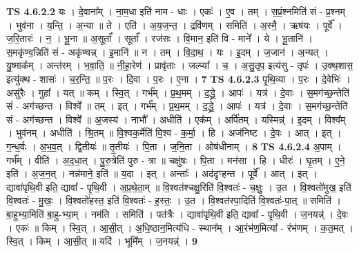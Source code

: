 \documentclass[17pt]{extarticle}
\begin{document}
                  \newline
                                \textbf{ TS 4.6.2.2} \newline
                  यः । दे॒वाना᳚म् । ना॒म॒धा इति॑ नाम - धाः । एकः॑ । ए॒व । तम् । स॒प्रं॒श्नमिति॑ सं - प्र॒श्नम् । भुव॑ना । य॒न्ति॒ । अ॒न्या ॥ ते । एति॑ । अ॒य॒ज॒न्त॒ । द्रवि॑णम् । समिति॑ । अ॒स्मै॒ । ऋष॑यः । पूर्वे᳚ । ज॒रि॒तारः॑ । न॒ । भू॒ना ॥ अ॒सूर्ता᳚ । सूर्ता᳚ । रज॑सः । वि॒मान॒ इति॑ वि - माने᳚ । ये । भू॒तानि॑ । स॒मकृ॑ण्व॒न्निति॑ सं - अकृ॑ण्वन्न् । इ॒मानि॑ ॥ न । तम् । वि॒दा॒थ॒ । यः । इ॒दम् । ज॒जान॑ । अ॒न्यत् । यु॒ष्माक᳚म् । अन्त॑रम् । भ॒वा॒ति॒ ॥ नी॒हा॒रेण॑ । प्रावृ॑ताः । जल्प्या᳚ । च॒ । अ॒सु॒तृप॒ इत्य॑सु - तृपः॑ । उ॒क्थ॒शास॒ इत्यु॑क्थ - शासः॑ । च॒र॒न्ति॒ ॥ प॒रः । दि॒वा । प॒रः । ए॒ना । \textbf{  7} \newline
                  \newline
                                \textbf{ TS 4.6.2.3} \newline
                  पृ॒थि॒व्या । प॒रः । दे॒वेभिः॑ । असु॑रैः । गुहा᳚ । यत् ॥ कम् । स्वि॒त् । गर्भ᳚म् । प्र॒थ॒मम् । द॒द्ध्रे॒ । आपः॑ । यत्र॑ । दे॒वाः । स॒मग॑च्छ॒न्तेति॑ सं - अग॑च्छन्त । विश्वे᳚ ॥ तम् । इत् । गर्भ᳚म् । प्र॒थ॒मम् । द॒द्ध्रे॒ । आपः॑ । यत्र॑ । दे॒वाः । स॒मग॑च्छ॒न्तेति॑ सं - अग॑च्छन्त । विश्वे᳚ ॥ अ॒जस्य॑ । नाभौ᳚ । अधीति॑ । एक᳚म् । अर्पि॑तम् । यस्मिन्न्॑ । इ॒दम् । विश्व᳚म् । भुव॑नम् । अधीति॑ । श्रि॒तम् ॥ वि॒श्वक॒र्मेति॑ वि॒श्व - क॒र्मा॒ । हि । अज॑निष्ट । दे॒वः । आत् । इत् । ग॒न्ध॒र्वः । अ॒भ॒व॒त् । द्वि॒तीयः॑ ॥ तृ॒तीयः॑ । पि॒ता । ज॒नि॒ता । ओष॑धीनाम् । \textbf{  8} \newline
                  \newline
                                \textbf{ TS 4.6.2.4} \newline
                  अ॒पाम् । गर्भ᳚म् । वीति॑ । अ॒द॒धा॒त् । पु॒रु॒त्रेति॑ पुरु - त्रा ॥ चक्षु॑षः । पि॒ता । मन॑सा । हि । धीरः॑ । घृ॒तम् । ए॒ने॒ इति॑ । अ॒ज॒न॒त् । नन्न॑माने॒ इति॑ ॥ य॒दा । इत् । अन्ताः᳚ । अद॑दृꣳहन्त । पूर्वे᳚ । आत् । इत् । द्यावा॑पृथि॒वी इति॒ द्यावा᳚ - पृ॒थि॒वी । अ॒प्र॒थे॒ता॒म् ॥ वि॒श्वत॑श्चक्षु॒रिति॑ वि॒श्वतः॑ - च॒क्षुः॒ । उ॒त । वि॒श्वतो॑मुख॒ इति॑ वि॒श्वतः॑ - मु॒खः॒ । वि॒श्वतो॑हस्त॒ इति॑ वि॒श्वतः॑ - ह॒स्तः॒ । उ॒त । वि॒श्वत॑स्पा॒दिति॑ वि॒श्वतः॑-पा॒त् ॥ समिति॑ । बा॒हुभ्या॒मिति॑ बा॒हु-भ्या॒म् । नम॑ति । समिति॑ । पत॑त्रैः । द्यावा॑पृथि॒वी इति॒ द्यावा᳚ - पृ॒थि॒वी । ज॒नयन्न्॑ । दे॒वः । एकः॑ ॥ किम् । स्वि॒त् । आ॒सी॒त् । अ॒धि॒ष्ठान॒मित्य॑धि - स्थान᳚म् । आ॒रंभ॑ण॒मित्या᳚ - रंभ॑णम् । क॒त॒मत् । स्वि॒त् । किम् । आ॒सी॒त् ॥ यदि॑ । भूमि᳚म् । ज॒नयन्न्॑ । \textbf{  9} \newline
\end{document}
